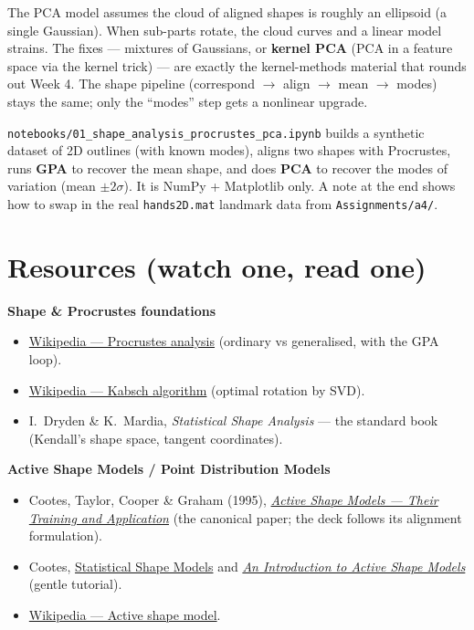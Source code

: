 \documentclass[11pt]{article}
\begin{document}
\begin{notebox}
The PCA model assumes the cloud of aligned shapes is roughly an ellipsoid (a
single Gaussian). When sub-parts rotate, the cloud curves and a linear model
strains. The fixes --- mixtures of Gaussians, or \textbf{kernel PCA} (PCA in a
feature space via the kernel trick) --- are exactly the kernel-methods material
that rounds out Week 4. The shape pipeline (correspond $\to$ align $\to$ mean
$\to$ modes) stays the same; only the ``modes'' step gets a nonlinear upgrade.
\end{notebox}

\begin{keybox}
\texttt{notebooks/01\_shape\_analysis\_procrustes\_pca.ipynb} builds a synthetic
dataset of 2D outlines (with known modes), aligns two shapes with Procrustes,
runs \textbf{GPA} to recover the mean shape, and does \textbf{PCA} to recover the
modes of variation (mean $\pm 2\sigma$). It is NumPy + Matplotlib only. A note at
the end shows how to swap in the real \texttt{hands2D.mat} landmark data from
\texttt{Assignments/a4/}.
\end{keybox}

\section*{Resources (watch one, read one)}

\textbf{Shape \& Procrustes foundations}
\begin{itemize}[nosep,leftmargin=*]
  \item \href{https://en.wikipedia.org/wiki/Procrustes_analysis}{Wikipedia --- Procrustes analysis} (ordinary vs generalised, with the GPA loop).
  \item \href{https://en.wikipedia.org/wiki/Kabsch_algorithm}{Wikipedia --- Kabsch algorithm} (optimal rotation by SVD).
  \item I.\ Dryden \& K.\ Mardia, \emph{Statistical Shape Analysis} --- the standard book (Kendall's shape space, tangent coordinates).
\end{itemize}

\textbf{Active Shape Models / Point Distribution Models}
\begin{itemize}[nosep,leftmargin=*]
  \item Cootes, Taylor, Cooper \& Graham (1995), \href{https://personalpages.manchester.ac.uk/staff/timothy.f.cootes/papers/cviu95.pdf}{\emph{Active Shape Models --- Their Training and Application}} (the canonical paper; the deck follows its alignment formulation).
  \item Cootes, \href{https://personalpages.manchester.ac.uk/staff/timothy.f.cootes/Models/pdms.html}{Statistical Shape Models} and \href{https://people.computing.clemson.edu/~ekp/courses/cpsc9500/assets/IntroASM.pdf}{\emph{An Introduction to Active Shape Models}} (gentle tutorial).
  \item \href{https://en.wikipedia.org/wiki/Active_shape_model}{Wikipedia --- Active shape model}.
\end{itemize}
\end{document}
